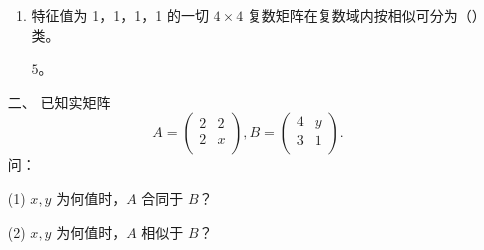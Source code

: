 \begin{enumerate}[1~]
\begin{enumerate}[1.~]
\item
特征值为 1，1，1，1 的一切 $4\times4$ 复数矩阵在复数域内按相似可分为（\quad）类。

\begin{solution}
$5$。
\end{solution}
\end{enumerate}

\item[二、]
已知实矩阵
$$
A = \left( \begin{matrix}
2&  2\\
2&  x\\ 
\end{matrix} \right),
B = \left( \begin{matrix}
4&  y\\
3&  1\\ 
\end{matrix} \right).
$$
问：

(1) $x, y$ 为何值时，$A$ 合同于 $B$？

(2) $x, y$ 为何值时，$A$ 相似于 $B$？


\end{enumerate}
